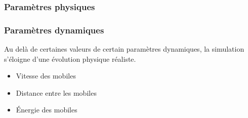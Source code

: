 \subsubsection{Paramètres physiques}
%
%
\subsubsection{Paramètres dynamiques}
%
Au delà de certaines valeurs de certain paramètres dynamiques, la simulation s'éloigne d'une évolution physique réaliste.
\begin{itemize}[label=, leftmargin=2cm]
\item Vitesse des mobiles
\item Distance entre les mobiles
\item Énergie des mobiles
\end{itemize}
%
